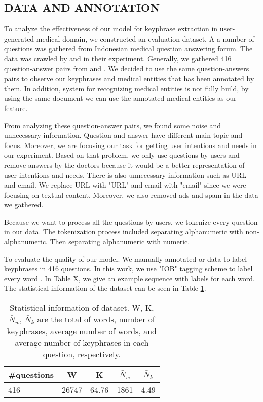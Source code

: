 \subsection{DATA AND ANNOTATION}
To analyze the effectiveness of our model for keyphrase extraction in user-generated medical domain, we constructed an evaluation dataset. A a number of questions was gathered from Indonesian medical question answering forum. The data was crawled by \cite{skripsiKakRadit} and \cite{skripsiWahid} in their experiment. Generally, we gathered 416 question-answer pairs from \cite{skripsiKakRadit} and \cite{skripsiWahid}. We decided to use the same question-answers pairs to observe our keyphrases and medical entities that has been annotated by them. In addition, system for recognizing medical entities is not fully build, by using the same document we can use the annotated medical entities as our feature.

From analyzing these question-answer pairs, we found some noise and unnecessary information. Question and answer have different main topic and focus. Moreover, we are focusing our task for getting user intentions and needs in our experiment. Based on that problem, we only use questions by users and remove answers by the doctors because it would be a better representation of user intentions and needs. There is also unnecessary information such as URL and email. We replace URL with "URL"  and email with "email" since we were focusing on textual content. Moreover, we also removed ads and spam in the data we gathered.

Because we want to process all the questions by users, we tokenize every question in our data. The tokenization process included separating alphanumeric with non-alphanumeric. Then separating alphanumeric with numeric. 

To evaluate the quality of our model. We manually annotated or data to label keyphrases in 416 questions. In this work, we use "IOB" tagging scheme to label every word \cite{collobert2011natural}. In Table X, we give an example sequence with labels for each word. The statistical information of the dataset can be seen in Table \ref{tab:descriptive_stats}.
\begin{table}
	\caption{Statistical information of dataset. W, K, $\bar{N}_{w}$, $\bar{N}_{k}$ are the total of words, number of keyphrases, average number of words, and average number of keyphrases in each question, respectively.}
	\label{tab:descriptive_stats}
	\begin{tabular}{lcccc}
		\toprule
		\#questions&W&K&$\bar{N}_{w}$&$\bar{N}_{k}$\\
		\midrule
		416 & 26747  & 64.76 & 1861 & 4.49 \\
		
		\bottomrule
	\end{tabular}
\end{table}
\fi


